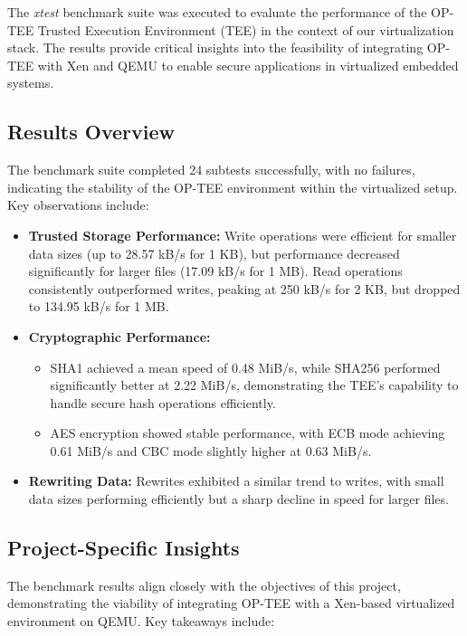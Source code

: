 \documentclass[acmtog]{acmart}
\begin{document}
The \textit{xtest} benchmark suite was executed to evaluate the performance of the OP-TEE Trusted Execution Environment (TEE) in the context of our virtualization stack. The results provide critical insights into the feasibility of integrating OP-TEE with Xen and QEMU to enable secure applications in virtualized embedded systems.

\subsection{Results Overview}
The benchmark suite completed 24 subtests successfully, with no failures, indicating the stability of the OP-TEE environment within the virtualized setup. Key observations include:

\begin{itemize}
    \item \textbf{Trusted Storage Performance:} Write operations were efficient for smaller data sizes (up to 28.57 kB/s for 1 KB), but performance decreased significantly for larger files (17.09 kB/s for 1 MB). Read operations consistently outperformed writes, peaking at 250 kB/s for 2 KB, but dropped to 134.95 kB/s for 1 MB.
    \item \textbf{Cryptographic Performance:} 
    \begin{itemize}
        \item SHA1 achieved a mean speed of 0.48 MiB/s, while SHA256 performed significantly better at 2.22 MiB/s, demonstrating the TEE's capability to handle secure hash operations efficiently.
        \item AES encryption showed stable performance, with ECB mode achieving 0.61 MiB/s and CBC mode slightly higher at 0.63 MiB/s.
    \end{itemize}
    \item \textbf{Rewriting Data:} Rewrites exhibited a similar trend to writes, with small data sizes performing efficiently but a sharp decline in speed for larger files.
\end{itemize}

\subsection{Project-Specific Insights}
The benchmark results align closely with the objectives of this project, demonstrating the viability of integrating OP-TEE with a Xen-based virtualized environment on QEMU. Key takeaways include:
\end{document}
